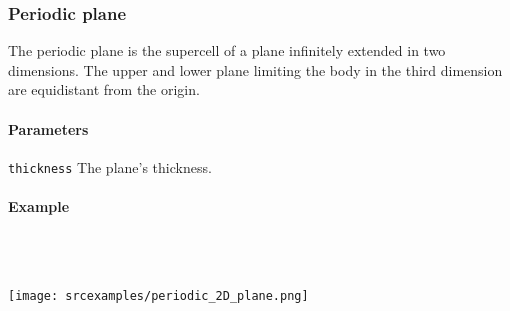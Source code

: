 \subsubsection{Periodic plane}
The periodic plane is the supercell of a plane infinitely extended in two dimensions. The upper and lower plane limiting the body in the third dimension are equidistant from the origin.

\paragraph{Parameters}
\begin{description}
 \item{\lstinline{thickness}} The plane's thickness.
\end{description}

\paragraph{Example}\ 


\ \\\texttt{[image: srcexamples/periodic\_2D\_plane.png]}